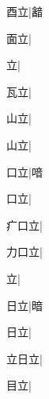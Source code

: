 \begin{multicols}{2}
{{酉立}|{\cjk{}韽}\par
{\cjk{}{\cnsym{}　}面立}\mktsJzrVerticalBar{}{\cjk{}{\cnsym{}　}{\cnsym{}　}{\cnsym{}　}}|{}\par
{立}\mktsJzrVerticalBar{}{\cjk{}{\cnsym{}　}{\cnsym{}　}{\cnsym{}　}}|{}\par
{\cjk{}{\cnsym{}　}瓦立}\mktsJzrVerticalBar{}{\cjk{}{\cnsym{}　}{\cnsym{}　}{\cnsym{}　}}|{}\par
{\cjk{}{\cnsym{}　}山立}\mktsJzrVerticalBar{}{\cjk{}{\cnsym{}　}{\cnsym{}　}{\cnsym{}　}}|{}\par
{\cjk{}{\cnsym{}　}山立}\mktsJzrVerticalBar{}{\cjk{}{\cnsym{}　}{\cnsym{}　}{\cnsym{}　}}|{}\par
{\cjk{}{\cnsym{}　}口立}\mktsJzrVerticalBar{}{\cjk{}{\cnsym{}　}{\cnsym{}　}{\cnsym{}　}}|{\cjk{}喑}\par
{口立}\mktsJzrVerticalBar{}{\cjk{}{\cnsym{}　}{\cnsym{}　}{\cnsym{}　}}|{}\par
{\cjk{}疒口立}\mktsJzrVerticalBar{}{\cjk{}{\cnsym{}　}{\cnsym{}　}{\cnsym{}　}}|{}\par
{\cjk{}力口立}\mktsJzrVerticalBar{}{\cjk{}{\cnsym{}　}{\cnsym{}　}{\cnsym{}　}}|{}\par
{立}\mktsJzrVerticalBar{}{\cjk{}{\cnsym{}　}{\cnsym{}　}{\cnsym{}　}}|{}\par
{\cjk{}{\cnsym{}　}日立}\mktsJzrVerticalBar{}{\cjk{}{\cnsym{}　}{\cnsym{}　}{\cnsym{}　}}|{\cjk{}暗}\par
{日立}\mktsJzrVerticalBar{}{\cjk{}{\cnsym{}　}{\cnsym{}　}{\cnsym{}　}}|{}\par
{\cjk{}立日立}\mktsJzrVerticalBar{}{\cjk{}{\cnsym{}　}{\cnsym{}　}{\cnsym{}　}}|{}\par
{\cjk{}{\cnsym{}　}目立}\mktsJzrVerticalBar{}{\cjk{}{\cnsym{}　}{\cnsym{}　}{\cnsym{}　}}|{}\par
}
\end{multicols}
